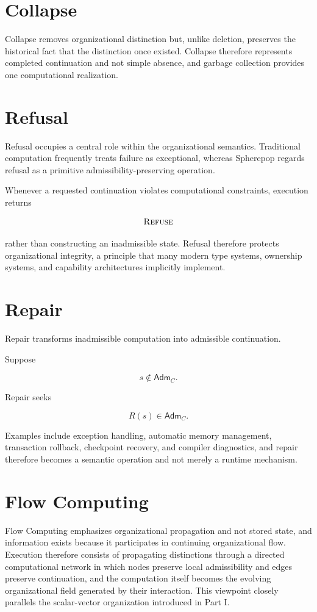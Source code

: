 \documentclass[11pt,oneside]{book}
\numberwithin{equation}{chapter}
\theoremstyle{definition}
\theoremstyle{plain}
\newcommand{\Adm}{\mathsf{Adm}}
\begin{document}
\section{Collapse}

Collapse removes organizational distinction but, unlike deletion, preserves the historical fact that the distinction once existed. Collapse therefore represents completed continuation and not simple absence, and garbage collection provides one computational realization.

\section{Refusal}

Refusal occupies a central role within the organizational semantics. Traditional computation frequently treats failure as exceptional, whereas Spherepop regards refusal as a primitive admissibility-preserving operation.

Whenever a requested continuation violates computational constraints,
execution returns

\[
\textsc{Refuse}
\]

rather than constructing an inadmissible state. Refusal therefore protects organizational integrity, a principle that many modern type systems, ownership systems, and capability architectures implicitly implement.

\section{Repair}

Repair transforms inadmissible computation into admissible continuation.

Suppose

\[
s
\notin
\Adm_C.
\]

Repair seeks

\[
R(s)
\in
\Adm_C.
\]

Examples include exception handling, automatic memory management, transaction rollback, checkpoint recovery, and compiler diagnostics, and repair therefore becomes a semantic operation and not merely a runtime mechanism.

\section{Flow Computing}

Flow Computing emphasizes organizational propagation and not stored state, and information exists because it participates in continuing organizational flow. Execution therefore consists of propagating distinctions through a directed computational network in which nodes preserve local admissibility and edges preserve continuation, and the computation itself becomes the evolving organizational field generated by their interaction. This viewpoint closely parallels the scalar-vector organization introduced in Part I.
\end{document}
